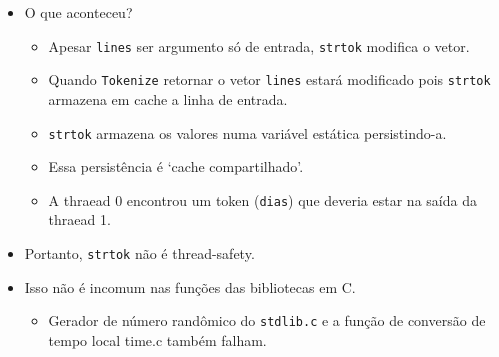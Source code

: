 	\begin{frame}
		\begin{itemize}
			\item O que aconteceu?
			\begin{itemize}
				\item Apesar {\tt lines} ser argumento só de entrada, {\tt strtok} modifica o vetor.
				\item Quando {\tt Tokenize} retornar o vetor {\tt lines} estará modificado pois {\tt strtok} armazena em cache a linha de entrada. 
				\item {\tt strtok} armazena os valores numa variável estática persistindo-a. 
				\item Essa persistência é `cache compartilhado'.
				\item A thraead 0 encontrou um token ({\tt dias}) que deveria estar na saída da thraead 1.
			\end{itemize}
			\item Portanto, {\tt strtok} não é thread-safety.
			\item Isso não é incomum nas funções das bibliotecas em C.
			\begin{itemize}
				\item Gerador de número randômico do {\tt stdlib.c} e a função de conversão de tempo local {time.c} também falham.
			\end{itemize}
		\end{itemize}
	\end{frame}

